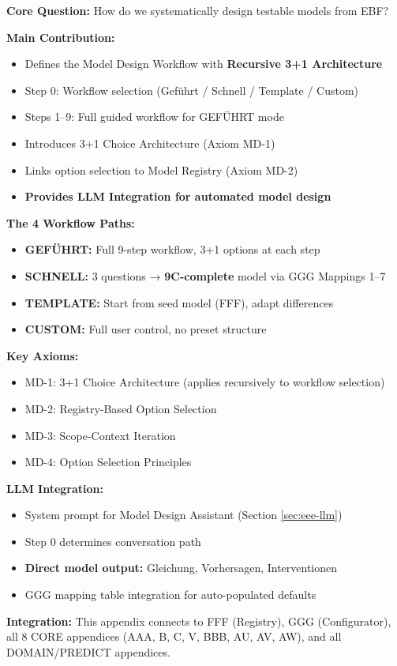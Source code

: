 \begin{tcolorbox}[colback=green!10!white, colframe=green!75!black,
    title=\textbf{Appendix EEE: Summary}]

\textbf{Core Question:} How do we systematically design testable models from EBF?

\textbf{Main Contribution:}
\begin{itemize}[nosep]
    \item Defines the Model Design Workflow with \textbf{Recursive 3+1 Architecture}
    \item Step 0: Workflow selection (Geführt / Schnell / Template / Custom)
    \item Steps 1--9: Full guided workflow for GEFÜHRT mode
    \item Introduces 3+1 Choice Architecture (Axiom MD-1)
    \item Links option selection to Model Registry (Axiom MD-2)
    \item \textbf{Provides LLM Integration for automated model design}
\end{itemize}

\textbf{The 4 Workflow Paths:}
\begin{itemize}[nosep]
    \item \textbf{GEFÜHRT:} Full 9-step workflow, 3+1 options at each step
    \item \textbf{SCHNELL:} 3 questions → \textbf{9C-complete} model via GGG Mappings 1--7
    \item \textbf{TEMPLATE:} Start from seed model (FFF), adapt differences
    \item \textbf{CUSTOM:} Full user control, no preset structure
\end{itemize}

\textbf{Key Axioms:}
\begin{itemize}[nosep]
    \item MD-1: 3+1 Choice Architecture (applies recursively to workflow selection)
    \item MD-2: Registry-Based Option Selection
    \item MD-3: Scope-Context Iteration
    \item MD-4: Option Selection Principles
\end{itemize}

\textbf{LLM Integration:}
\begin{itemize}[nosep]
    \item System prompt for Model Design Assistant (Section \ref{sec:eee-llm})
    \item Step 0 determines conversation path
    \item \textbf{Direct model output:} Gleichung, Vorhersagen, Interventionen
    \item GGG mapping table integration for auto-populated defaults
\end{itemize}

\textbf{Integration:} This appendix connects to FFF (Registry), GGG (Configurator),
all 8 CORE appendices (AAA, B, C, V, BBB, AU, AV, AW), and all DOMAIN/PREDICT appendices.

\end{tcolorbox}



